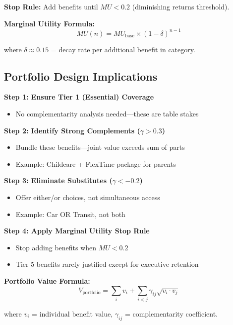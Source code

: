 \textbf{Stop Rule:} Add benefits until $MU < 0.2$ (diminishing returns threshold).

\textbf{Marginal Utility Formula:}
\begin{equation}
MU(n) = MU_{\text{base}} \times (1 - \delta)^{n-1}
\label{eq:mu-diminishing}
\end{equation}

where $\delta \approx 0.15$ = decay rate per additional benefit in category.

\subsection{Portfolio Design Implications}
\label{subsec:portfolio-implications}

\begin{tcolorbox}[colback=orange!5!white,colframe=orange!75!black,title=\textbf{Optimal Benefits Portfolio Design}]

\textbf{Step 1: Ensure Tier 1 (Essential) Coverage}
\begin{itemize}[noitemsep]
    \item No complementarity analysis needed---these are table stakes
\end{itemize}

\textbf{Step 2: Identify Strong Complements ($\gamma > 0.3$)}
\begin{itemize}[noitemsep]
    \item Bundle these benefits---joint value exceeds sum of parts
    \item Example: Childcare + FlexTime package for parents
\end{itemize}

\textbf{Step 3: Eliminate Substitutes ($\gamma < -0.2$)}
\begin{itemize}[noitemsep]
    \item Offer either/or choices, not simultaneous access
    \item Example: Car OR Transit, not both
\end{itemize}

\textbf{Step 4: Apply Marginal Utility Stop Rule}
\begin{itemize}[noitemsep]
    \item Stop adding benefits when $MU < 0.2$
    \item Tier 5 benefits rarely justified except for executive retention
\end{itemize}

\textbf{Portfolio Value Formula:}
\begin{equation}
V_{\text{portfolio}} = \sum_{i} v_i + \sum_{i<j} \gamma_{ij} \sqrt{v_i \cdot v_j}
\label{eq:portfolio-value}
\end{equation}

where $v_i$ = individual benefit value, $\gamma_{ij}$ = complementarity coefficient.

\end{tcolorbox}

